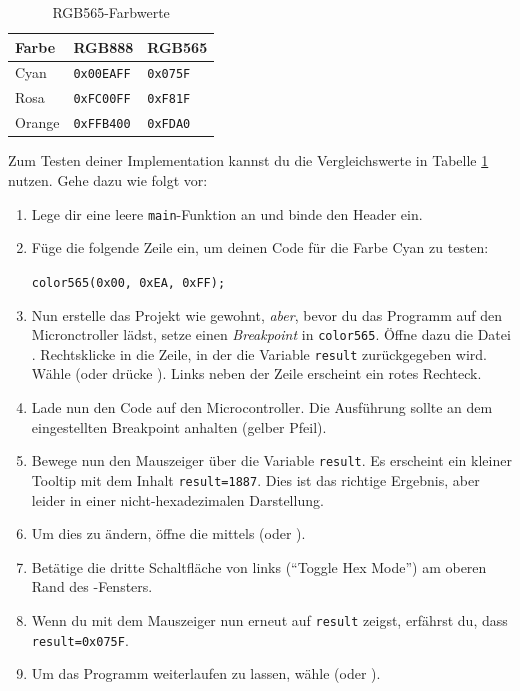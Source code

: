 \begin{table}[!htb]
	\centering
	\caption{RGB565-Farbwerte}
	\label{tab:rgb565Table}
	\begin{tabular}{lll}
        \toprule
		\textbf{Farbe} & \textbf{RGB888} & \textbf{RGB565} \\
        \midrule
		Cyan   & \lstinline|0x00EAFF| & \lstinline|0x075F| \\
		Rosa   & \lstinline|0xFC00FF| & \lstinline|0xF81F| \\
		Orange & \lstinline|0xFFB400| & \lstinline|0xFDA0| \\
        \bottomrule
	\end{tabular}
\end{table}

Zum Testen deiner Implementation kannst du die Vergleichswerte in Tabelle \ref{tab:rgb565Table} nutzen.
Gehe dazu wie folgt vor:
\begin{enumerate}
\item 
Lege dir eine leere \lstinline|main|-Funktion an und binde den Header  ein.
\item 
Füge die folgende Zeile ein, um deinen Code für die Farbe Cyan zu testen:

\lstinline$color565(0x00, 0xEA, 0xFF);$

\item 
Nun erstelle das Projekt wie gewohnt, \emph{aber}, bevor du das Programm auf den Micronctroller lädst, setze einen \emph{Breakpoint} in \lstinline|color565|.
Öffne dazu die Datei .
Rechtsklicke in die Zeile, in der die Variable \lstinline|result| zurückgegeben wird.
Wähle  (oder drücke ).
Links neben der Zeile erscheint ein rotes Rechteck.
\item 
Lade nun den Code auf den Microcontroller.
Die Ausführung sollte an dem eingestellten Breakpoint anhalten (gelber Pfeil).
\item 
Bewege nun den Mauszeiger über die Variable \lstinline|result|.
Es erscheint ein kleiner Tooltip mit dem Inhalt \lstinline|result=1887|.
Dies ist das richtige Ergebnis, aber leider in einer nicht-hexadezimalen Darstellung.
\item 
Um dies zu ändern, öffne die  mittels  (oder ).
\item 
Betätige die dritte Schaltfläche von links (\enquote{Toggle Hex Mode}) am oberen Rand des -Fensters.
\item 
Wenn du mit dem Mauszeiger nun erneut auf \lstinline|result| zeigst, erfährst du, dass \lstinline|result=0x075F|.
\item 
Um das Programm weiterlaufen zu lassen, wähle  (oder ).
\end{enumerate}

